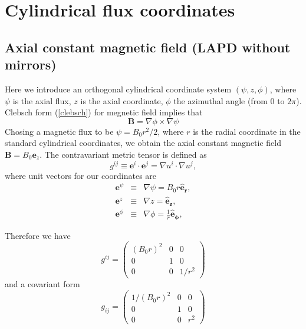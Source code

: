 \documentclass[11pt, oneside]{article}
\begin{document}
\newpage
\section{Cylindrical flux coordinates}
\subsection{Axial constant magnetic field (LAPD without
mirrors)}

Here we introduce an orthogonal cylindrical coordinate system $(\psi, z, \phi)$, where $\psi$ is the axial flux, $z$ is the axial coordinate, $\phi$ the azimuthal angle (from $0$ to $2 \pi$). Clebsch form (\ref{clebsch}) for megnetic field implies that
\begin{equation*}
\mathbf{B} =\nabla \phi \times \nabla \psi
\end{equation*}%
Chosing a magnetic flux to be $\psi = B_0 r^2 / 2$, where $r$ is the radial coordinate in the standard cylindrical coordinates, we obtain the axial constant magnetic field $\mathbf{B} = B_0 \mathbf{e}_z$.
The contravariant metric tensor is defined as 
\begin{equation}
g^{ij}\equiv \mathbf{e}^{i}\cdot\mathbf{e}^{j}=\nabla u^{i}\cdot \nabla u^{j},
\end{equation}
where unit vectors for our coordinates are
\begin{eqnarray}
\mathbf{e}^{\psi} &\equiv& \nabla \psi = B_{0}r\mathbf{\hat{e}_{r}}, \\
\mathbf{e}^{z} &\equiv& \nabla z = \mathbf{\hat{e}_{z}}, \\
\mathbf{e}^{\phi} &\equiv& \nabla \phi = \frac{1}{r}\mathbf{\hat{e}_{\phi }},
\end{eqnarray}%

Therefore we have 
\begin{equation*}
g^{ij}=\left(
\begin{array}{ccc}
\left( B_{0}r\right) ^{2} & 0 & 0 \\
0 & 1 & 0 \\
0 & 0 & 1/r^{2}%
\end{array}%
\right)
\end{equation*}%
and a covariant form
\begin{equation*}
g_{ij}=\left(
\begin{array}{ccc}
1/\left( B_{0}r\right) ^{2} & 0 & 0 \\
0 & 1 & 0 \\
0 & 0 & r^{2}%
\end{array}%
\right)
\end{equation*}
\end{document}
